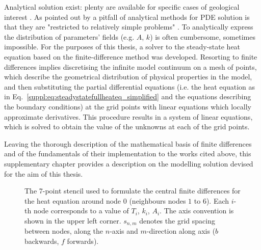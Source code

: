 Analytical solution exist: plenty are available for specific cases of geological interest \parencites(see e.g. )()[][chapter 4.6]{Turcotte2014_geodynamics}[][chapter 3.4]{stuwe2007geodynamics}.
As pointed out by \textcite{Gerya2010} a pitfall of analytical methods for PDE solution is that they are "restricted to relatively simple problems" \parencite[][chapter 3.1]{Gerya2010}.
To analytically express the distribution of parameters' fields (e.g. $A$, $k$) is often cumbersome, sometimes impossible.
For the purposes of this thesis, a solver to the steady-state heat equation based on the finite-difference method \parencites()()[][chapter 4.2]{Patankar1980}[][chapter 3.1]{Gerya2010} was developed.
Resorting to finite differences implies discretising the infinite model continuum on a mesh of points, which describe the geometrical distribution of physical properties in the model, and then substituting the partial differential equations (i.e. the heat equation as in Eq.~\ref{suppl:eq:steadystatefullheateq_simplified} and the equations describing the boundary conditions) at the grid points with linear equations which locally approximate derivatives.
This procedure results in a system of linear equations, which is solved to obtain the value of the unknowns at each of the grid points.

Leaving the thorough description of the mathematical basis of finite differences and of the fundamentals of their implementation to the works cited above, this supplementary chapter provides a description on the modelling solution devised for the aim of this thesis.


\FloatBarrier

\begin{figure}[hb]
    \begin{adjustbox}{center}
    \end{adjustbox}
    \caption[The 7-point stencil used to formulate the central finite differences.]{The 7-point stencil used to formulate the central finite differences for the heat equation around node $0$ (neighbours nodes $1$ to $6$).
    Each $i$-th node corresponds to a value of $T_i$, $k_i$, $A_i$.
    The axis convention is shown in the upper left corner.
    $s_{n,m}$ denotes the grid spacing between nodes, along the $n$-axis and $m$-direction along axis ($b$ backwards, $f$ forwards).}
    \label{suppl:fig:stencil}
\end{figure}

